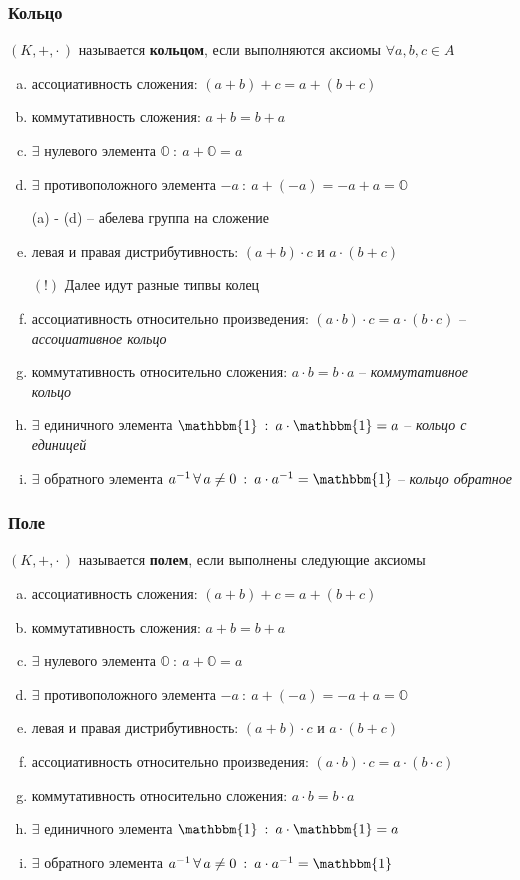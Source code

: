 \documentclass{article}
\begin{document}
\subsubsection{Кольцо}
$(K,+,\cdot\,)$ называется \textbf{кольцом}, если выполняются аксиомы $\forall a,b,c\in A$
    \begin{enumerate}[(a)]
        \item ассоциативность сложения: $(a+b)+c=a+(b+c)$
        \item коммутативность сложения: $a+b=b+a$
        \item $\exists$ нулевого элемента $\mathbb{O}\::\:a+\mathbb{O}=a$
        \item $\exists$ противоположного элемента $-a \::\: a+(-a)=-a+a=\mathbb{O}$
        
        (a) - (d) -- абелева группа на сложение
        \item левая и правая дистрибутивность: $(a+b)\cdot c$ и $a\cdot(b+c)$
        
        $(!)$ Далее идут разные типвы колец
        \item ассоциативность относительно произведения: $(a\cdot b)\cdot c=a\cdot (b\cdot c)$ -- \textit{ассоциативное кольцо}
        \item коммутативность относительно сложения: $a\cdot b=b\cdot a$ -- \textit{коммутативное кольцо}
        \item $\exists$ единичного элемента $\mathbbm{1}\::\:a\cdot\mathbbm{1}=a$ -- \textit{кольцо с единицей}
        \item $\exists$ обратного элемента $a^{-1}\,\forall\, a\neq0\::\:a\cdot a^{-1}=\mathbbm{1}$ -- \textit{кольцо обратное}
    \end{enumerate}
    
\subsubsection{Поле}
$(K,+,\cdot\,)$ называется \textbf{полем}, если выполнены следующие аксиомы
    \begin{enumerate}[(a)]
        \item ассоциативность сложения: $(a+b)+c=a+(b+c)$
        \item коммутативность сложения: $a+b=b+a$
        \item $\exists$ нулевого элемента $\mathbb{O}\::\:a+\mathbb{O}=a$
        \item $\exists$ противоположного элемента $-a \::\: a+(-a)=-a+a=\mathbb{O}$
        \item левая и правая дистрибутивность: $(a+b)\cdot c$ и $a\cdot(b+c)$
        \item ассоциативность относительно произведения: $(a\cdot b)\cdot c=a\cdot (b\cdot c)$
        \item коммутативность относительно сложения: $a\cdot b=b\cdot a$
        \item $\exists$ единичного элемента $\mathbbm{1}\::\:a\cdot\mathbbm{1}=a$
        \item $\exists$ обратного элемента $a^{-1}\,\forall\, a\neq0\::\:a\cdot a^{-1}=\mathbbm{1}$
    \end{enumerate}
\newpage
\end{document}
